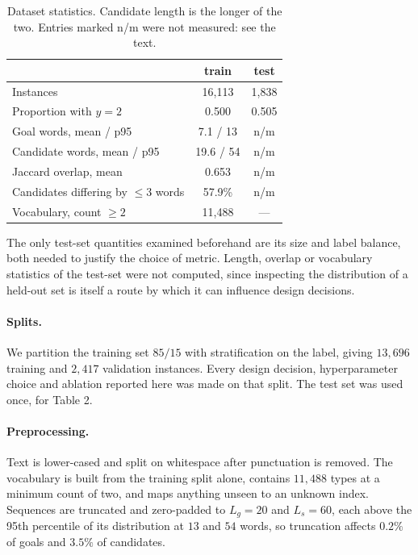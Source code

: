 \documentclass[11pt]{article}
\begin{document}
\begin{table}[t]
  \centering
  \scriptsize
  \caption{Dataset statistics. Candidate length is the longer of the two. Entries marked n/m were not measured: see the text.}
  \label{tab:1}
  \begin{tabularx}{\columnwidth}{@{}Xcc@{}}
    \toprule
     & \textbf{train} & \textbf{test} \\
    \midrule
    Instances & 16,113 & 1,838 \\
    Proportion with $y=2$ & 0.500 & 0.505 \\
    Goal words, mean / p95 & 7.1 / 13 & n/m \\
    Candidate words, mean / p95 & 19.6 / 54 & n/m \\
    Jaccard overlap, mean & 0.653 & n/m \\
    Candidates differing by $\leq 3$ words & 57.9\% & n/m \\
    Vocabulary, count $\geq 2$ & 11,488 & --- \\
    \bottomrule
  \end{tabularx}
\end{table}

The only test-set quantities examined beforehand are its size and label balance, both needed to justify the choice of metric. Length, overlap or vocabulary statistics of the test-set were not computed, since inspecting the distribution of a held-out set is itself a route by which it can influence design decisions.

\paragraph{Splits.}

We partition the training set $85/15$ with stratification on the label, giving $13,696$ training and $2,417$ validation instances. Every design decision, hyperparameter choice and ablation reported here was made on that split. The test set was used once, for Table 2.

\paragraph{Preprocessing.}

Text is lower-cased and split on whitespace after punctuation is removed. The vocabulary is built from the training split alone, contains $11,488$ types at a minimum count of two, and maps anything unseen to an unknown index. Sequences are truncated and zero-padded to ${L}_{g}=20$ and ${L}_{s}=60$, each above the 95th percentile of its distribution at $13$ and $54$ words, so truncation affects $0.2\%$ of goals and $3.5\%$ of candidates.
\end{document}
